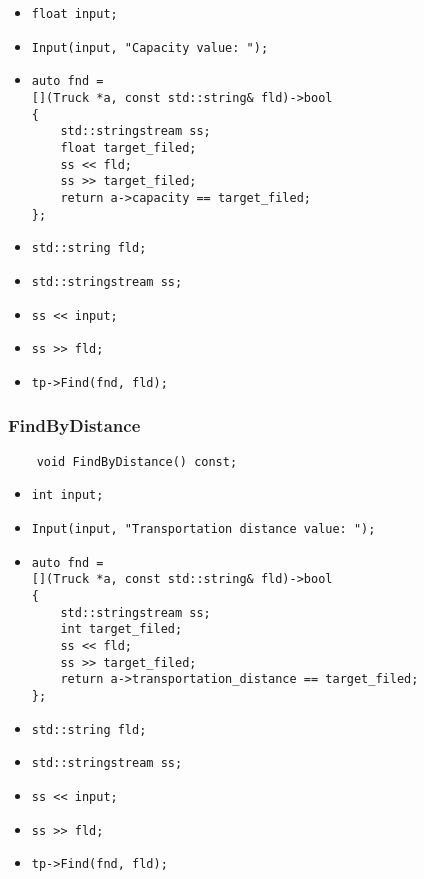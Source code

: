 \begin{itemize}
	\item \verb|float input;|
    \item \verb|Input(input, "Capacity value: ");|
    \item \verb|auto fnd =|\\
    \verb|[](Truck *a, const std::string& fld)->bool|\\
    \verb|{|\\
    \verb|    std::stringstream ss;|\\
    \verb|    float target_filed;|\\
    \verb|    ss << fld;|\\
    \verb|    ss >> target_filed;|\\
    \verb|    return a->capacity == target_filed;|\\
    \verb|};|
    \item \verb|std::string fld;|
    \item \verb|std::stringstream ss;|
    \item \verb|ss << input;|
    \item \verb|ss >> fld;|
    \item \verb|tp->Find(fnd, fld);|
\end{itemize}



\subsubsection*{FindByDistance}

\begin{lstlisting}
    void FindByDistance() const;
\end{lstlisting}

\begin{itemize}
	\item \verb|int input;|
    \item \verb|Input(input, "Transportation distance value: ");|
    \item \verb|auto fnd =|\\
    \verb|[](Truck *a, const std::string& fld)->bool|\\
    \verb|{|\\
    \verb|    std::stringstream ss;|\\
    \verb|    int target_filed;|\\
    \verb|    ss << fld;|\\
    \verb|    ss >> target_filed;|\\
    \verb|    return a->transportation_distance == target_filed;|\\
    \verb|};|
    \item \verb|std::string fld;|
    \item \verb|std::stringstream ss;|
    \item \verb|ss << input;|
    \item \verb|ss >> fld;|
    \item \verb|tp->Find(fnd, fld);|
\end{itemize}


